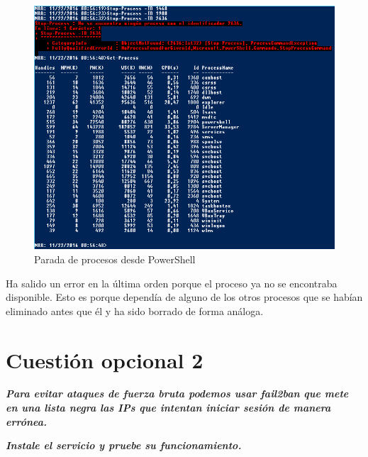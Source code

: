 \begin{figure}[H] %
	\centering
	\includegraphics[scale=0.8]{figuras/figura81.png} 
	\caption{Parada de procesos desde PowerShell}
	\label{fig:figura81}
\end{figure}

Ha salido un error en la última orden porque el proceso ya no se encontraba disponible. Esto es porque dependía de alguno de los otros procesos que se habían eliminado antes que él y ha sido borrado de forma análoga. 

\newpage


\section{Cuestión opcional 2}
\textbf{\textit{Para evitar ataques de fuerza bruta podemos usar fail2ban que mete en una
lista negra las IPs que intentan iniciar sesión de manera errónea.}}

\textbf{\textit{Instale el servicio y pruebe su funcionamiento.}} \cite{enlace21}

